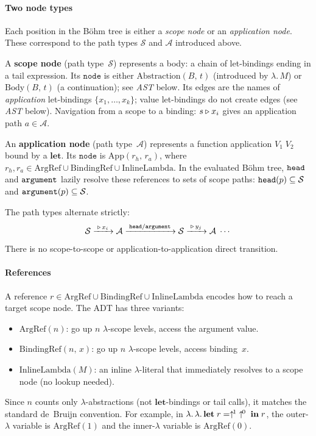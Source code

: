 \paragraph{Two node types}
Each position in the B\"ohm tree is either a \emph{scope node}
or an \emph{application node}.
These correspond to the path types $\mathcal{S}$ and
$\mathcal{A}$ introduced above.

A \textbf{scope node} (path type~$\mathcal{S}$)
represents a body: a chain of let-bindings ending
in a tail expression.
Its $\mathtt{node}$ is either
$\mathrm{Abstraction}(B,\,t)$
(introduced by $\lambda.\,M$) or
$\mathrm{Body}(B,\,t)$
(a continuation); see \emph{AST} below.
Its edges are the names of \emph{application} let-bindings
$\{x_1, \ldots, x_k\}$; value let-bindings do not create
edges (see \emph{AST} below).
Navigation from a scope to a binding:
$s \mathbin{\triangleright} x_i$ gives an application path
$a \in \mathcal{A}$.

An \textbf{application node} (path type~$\mathcal{A}$)
represents a function application $V_1\; V_2$ bound by a
$\mathbf{let}$.
Its $\mathtt{node}$ is $\mathrm{App}(r_h,\, r_a)$,
where $r_h, r_a \in \mathrm{ArgRef} \cup
\mathrm{BindingRef} \cup \mathrm{InlineLambda}$.
In the evaluated B\"ohm tree, $\mathtt{head}$ and $\mathtt{argument}$
lazily resolve these references to sets of scope paths:
$\mathtt{head}(p) \subseteq \mathcal{S}$
and $\mathtt{argument}(p) \subseteq \mathcal{S}$.

The path types alternate strictly:
\[
  \mathcal{S} \xrightarrow{\;\mathbin{\triangleright}\, x_i\;}
  \mathcal{A} \xrightarrow{\;\mathtt{head} / \mathtt{argument}\;}
  \mathcal{S} \xrightarrow{\;\mathbin{\triangleright}\, y_j\;}
  \mathcal{A} \;\cdots
\]
There is no scope-to-scope or
application-to-application direct transition.

\paragraph{References}
A reference
$r \in \mathrm{ArgRef} \cup \mathrm{BindingRef}
\cup \mathrm{InlineLambda}$
encodes how to reach a target scope node.
The ADT has three variants:
\begin{itemize}
  \item $\mathrm{ArgRef}(n)$: go up $n$
    $\lambda$-scope levels, access the argument value.
  \item $\mathrm{BindingRef}(n,\, x)$: go up $n$
    $\lambda$-scope levels, access binding~$x$.
  \item $\mathrm{InlineLambda}(M)$: an inline
    $\lambda$-literal that immediately resolves to a
    scope node (no lookup needed).
\end{itemize}
Since $n$ counts only $\lambda$-abstractions (not
$\mathbf{let}$-bindings or tail calls), it matches the
standard de~Bruijn convention.
For example, in $\lambda.\,\lambda.\,\mathbf{let}\; r =
\uparrow^{\!1}\;\uparrow^{\!0}\;\mathbf{in}\;r$, the outer-$\lambda$
variable is $\mathrm{ArgRef}(1)$ and the
inner-$\lambda$ variable is $\mathrm{ArgRef}(0)$.

